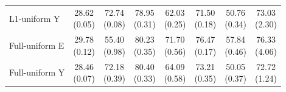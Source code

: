 \begin{table}[t]
\begin{tabular}{@{}lccccccc@{}}
L1-uniform Y & \shortstack{28.62\\{\scriptsize (0.05)}} & \shortstack{72.74\\{\scriptsize (0.08)}} & \shortstack{78.95\\{\scriptsize (0.31)}} & \shortstack{62.03\\{\scriptsize (0.25)}} & \shortstack{71.50\\{\scriptsize (0.18)}} & \shortstack{50.76\\{\scriptsize (0.34)}} & \shortstack{73.03\\{\scriptsize (2.30)}}\\
Full-uniform E & \shortstack{29.78\\{\scriptsize (0.12)}} & \shortstack{55.40\\{\scriptsize (0.98)}} & \shortstack{80.23\\{\scriptsize (0.35)}} & \shortstack{71.70\\{\scriptsize (0.56)}} & \shortstack{76.47\\{\scriptsize (0.17)}} & \shortstack{57.84\\{\scriptsize (0.46)}} & \shortstack{76.33\\{\scriptsize (4.06)}}\\
Full-uniform Y & \shortstack{28.46\\{\scriptsize (0.07)}} & \shortstack{72.18\\{\scriptsize (0.39)}} & \shortstack{80.40\\{\scriptsize (0.33)}} & \shortstack{64.09\\{\scriptsize (0.58)}} & \shortstack{73.21\\{\scriptsize (0.35)}} & \shortstack{50.05\\{\scriptsize (0.37)}} & \shortstack{72.72\\{\scriptsize (1.24)}}\\
\bottomrule\end{tabular}
\end{table}
